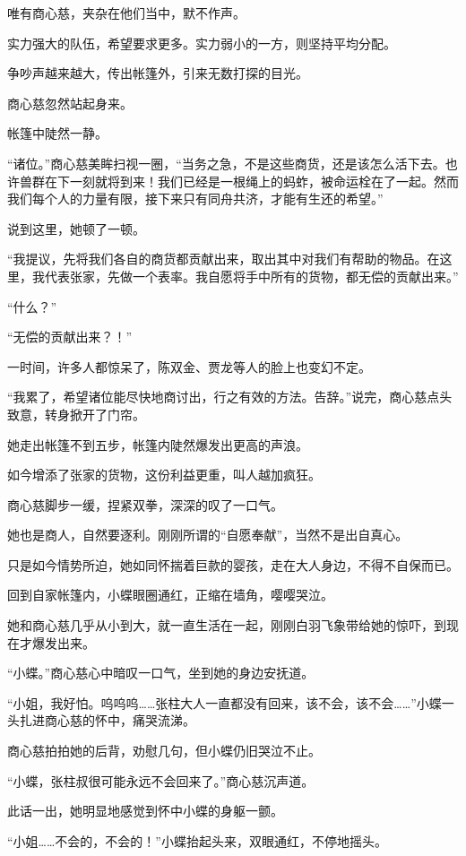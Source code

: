 \begin{this_body}
唯有商心慈，夹杂在他们当中，默不作声。

实力强大的队伍，希望要求更多。实力弱小的一方，则坚持平均分配。

争吵声越来越大，传出帐篷外，引来无数打探的目光。

商心慈忽然站起身来。

帐篷中陡然一静。

“诸位。”商心慈美眸扫视一圈，“当务之急，不是这些商货，还是该怎么活下去。也许兽群在下一刻就将到来！我们已经是一根绳上的蚂蚱，被命运栓在了一起。然而我们每个人的力量有限，接下来只有同舟共济，才能有生还的希望。”

说到这里，她顿了一顿。

“我提议，先将我们各自的商货都贡献出来，取出其中对我们有帮助的物品。在这里，我代表张家，先做一个表率。我自愿将手中所有的货物，都无偿的贡献出来。”

“什么？”

“无偿的贡献出来？！”

一时间，许多人都惊呆了，陈双金、贾龙等人的脸上也变幻不定。

“我累了，希望诸位能尽快地商讨出，行之有效的方法。告辞。”说完，商心慈点头致意，转身掀开了门帘。

她走出帐篷不到五步，帐篷内陡然爆发出更高的声浪。

如今增添了张家的货物，这份利益更重，叫人越加疯狂。

商心慈脚步一缓，捏紧双拳，深深的叹了一口气。

她也是商人，自然要逐利。刚刚所谓的“自愿奉献”，当然不是出自真心。

只是如今情势所迫，她如同怀揣着巨款的婴孩，走在大人身边，不得不自保而已。

回到自家帐篷内，小蝶眼圈通红，正缩在墙角，嘤嘤哭泣。

她和商心慈几乎从小到大，就一直生活在一起，刚刚白羽飞象带给她的惊吓，到现在才爆发出来。

“小蝶。”商心慈心中暗叹一口气，坐到她的身边安抚道。

“小姐，我好怕。呜呜呜……张柱大人一直都没有回来，该不会，该不会……”小蝶一头扎进商心慈的怀中，痛哭流涕。

商心慈拍拍她的后背，劝慰几句，但小蝶仍旧哭泣不止。

“小蝶，张柱叔很可能永远不会回来了。”商心慈沉声道。

此话一出，她明显地感觉到怀中小蝶的身躯一颤。

“小姐……不会的，不会的！”小蝶抬起头来，双眼通红，不停地摇头。


\end{this_body}
